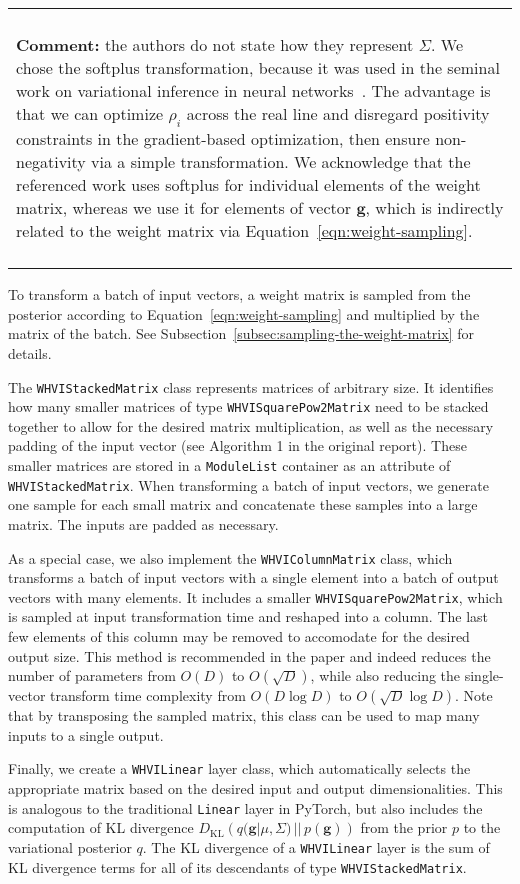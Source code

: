 \documentclass[11pt]{article}
\newenvironment{comment}
    {
    \begin{center}
    \begin{tabular}{|p{0.9\hsize}|}
    \hline\\
    \begin{footnotesize}\textbf{Comment:}}
    {
    \end{footnotesize}
    \\\\\hline
    \end{tabular}
    \end{center}
    }
\begin{document}
    \begin{comment}
    the authors do not state how they represent $\Sigma$.
    We chose the softplus transformation, because it was used in the seminal work on variational inference in neural networks~\cite{blundell2015weight}.
    The advantage is that we can optimize $\rho_i$ across the real line and disregard positivity constraints in the gradient-based optimization, then ensure non-negativity via a simple transformation.
    We acknowledge that the referenced work uses softplus for individual elements of the weight matrix, whereas we use it for elements of vector $\mathbf{g}$, which is indirectly related to the weight matrix via Equation~\ref{eqn:weight-sampling}.
    \end{comment}
    To transform a batch of input vectors, a weight matrix is sampled from the posterior according to Equation~\ref{eqn:weight-sampling} and multiplied by the matrix of the batch. See Subsection~\ref{subsec:sampling-the-weight-matrix} for details.

    The \texttt{WHVIStackedMatrix} class represents matrices of arbitrary size.
    It identifies how many smaller matrices of type \texttt{WHVISquarePow2Matrix} need to be stacked together to allow for the desired matrix multiplication, as well as the necessary padding of the input vector (see Algorithm 1 in the original report).
    These smaller matrices are stored in a \texttt{ModuleList} container as an attribute of \texttt{WHVIStackedMatrix}. When transforming a batch of input vectors, we generate one sample for each small matrix and concatenate these samples into a large matrix. The inputs are padded as necessary.

    As a special case, we also implement the \texttt{WHVIColumnMatrix} class, which transforms a batch of input vectors with a single element into a batch of output vectors with many elements.
    It includes a smaller \texttt{WHVISquarePow2Matrix}, which is sampled at input transformation time and reshaped into a column.
    The last few elements of this column may be removed to accomodate for the desired output size.
    This method is recommended in the paper and indeed reduces the number of parameters from $O(D)$ to $O(\sqrt{D})$, while also reducing the single-vector transform time complexity from $O(D\log D)$ to $O(\sqrt{D}\log D)$.
    Note that by transposing the sampled matrix, this class can be used to map many inputs to a single output.

    Finally, we create a \texttt{WHVILinear} layer class, which automatically selects the appropriate matrix based on the desired input and output dimensionalities.
    This is analogous to the traditional \texttt{Linear} layer in PyTorch, but also includes the computation of KL divergence $D_\mathrm{KL}\left(q(\mathbf{g}|\mu, \Sigma)\, ||\, p(\mathbf{g})\right)$ from the prior $p$ to the variational posterior $q$.
    The KL divergence of a \texttt{WHVILinear} layer is the sum of KL divergence terms for all of its descendants of type \texttt{WHVIStackedMatrix}.
\end{document}

